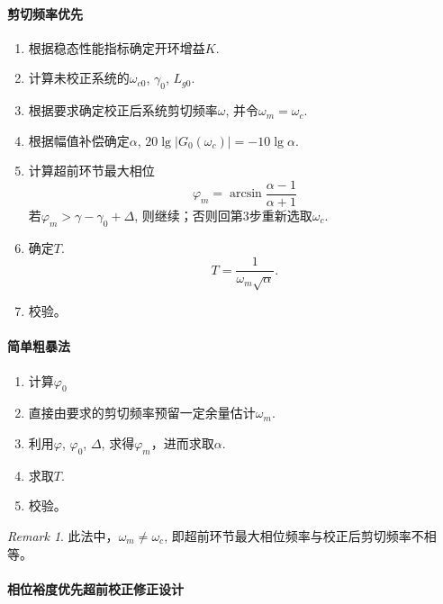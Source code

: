 \documentclass[14pt,a4paper]{article}
\theoremstyle{plain}
\theoremstyle{definition}
\theoremstyle{remark}
\newtheorem*{nnr}{Remark}
\theoremstyle{plain}
\theoremstyle{plain}
\theoremstyle{plain}
\theoremstyle{definition}
\theoremstyle{remark}
\numberwithin{equation}{section}
\begin{document}
				\paragraph{剪切频率优先}%
				\label{par:剪切频率优先}
				
					\begin{enumerate}
						\item 根据稳态性能指标确定开环增益$K$. 
						\item 计算未校正系统的$\omega_{c0}$, $\gamma_0$, $L_{g0}$. 
						\item 根据要求确定校正后系统剪切频率$\omega$, 并令$\omega_m = \omega_c$.  
						\item 根据幅值补偿确定$\alpha$, $20\lg \left| G_0(\omega_c) \right| = -10\lg\alpha$. 
						\item 计算超前环节最大相位
							\[
								\varphi_m = \arcsin \dfrac{\alpha-1}{\alpha+1}
							\] 
							若$\varphi_m>\gamma-\gamma_0+\Delta$, 则继续；否则回第3步重新选取$\omega_c$. 
						\item 确定$T$. 
							\[
							T = \dfrac{1}{\omega_m \sqrt{\alpha}}
							.\] 
						\item 校验。
					\end{enumerate}
				

				\paragraph{简单粗暴法}%
				\label{par:简单粗暴法}

					\begin{enumerate}
						\item 计算$\varphi_0$ 
						\item 直接由要求的剪切频率预留一定余量估计$\omega_m$. 
						\item 利用$\varphi$, $\varphi_0$, $\Delta$, 求得$\varphi_m$，进而求取$\alpha$. 
						\item 求取$T$.
						\item 校验。
					\end{enumerate} 

					\begin{nnr}  
						此法中，$\omega_m \neq  \omega_c$, 即超前环节最大相位频率与校正后剪切频率不相等。
					\end{nnr} 
				
				\paragraph{相位裕度优先超前校正修正设计}%
				\label{par:相位裕度优先超前校正修正设计}
				
\end{document}
